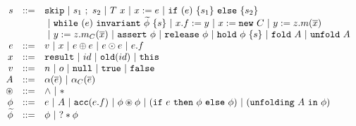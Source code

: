 \begin{spacing}{1.5}
\begin{align*}
\begin{array}{rcl}
s                 &::=& \code{skip}
                       \alt s_1 \ ; \ s_2
                       \alt T\ x \alt x := e
                       \alt \code{if} \ (e) \ \{s_1\} \ \code{else} \ \{s_2\} \\ &&
                       \alt \code{while} \ (e) \ \code{invariant} \ \tphi \ \{ s \}
                       \alt x.f := y
                       \alt x := \code{new} \ C
                       \alt y := z.m(\overline{x}) \\ &&
                       \alt y := z.m_C(\overline{x})
                       \alt \code{assert} \ \phi
                       \alt \code{release} \ \phi
                       \alt \code{hold} \ \phi \ \{ s \}
                       \alt \code{fold} \ A
                       \alt \code{unfold} \ A
                       \\
e                 &::=& v \alt x \alt e \oplus e \alt e \odot e \alt e.f \\
x                 &::=& \code{result} \alt id \alt \code{old}(id) \alt \code{this} \\
v                 &::=& n \alt o \alt \code{null} \alt \code{true} \alt \code{false} \\
A                 &::=& \alpha (\overline{e}) \alt \alpha_C (\overline{e}) \\
\circledast       &::=& \land \alt \ast \\
\phi              &::=& e
                      \alt A
                      \alt \code{acc}(e.f)
                      \alt \phi \circledast \phi
                      \alt (\code{if} \ e \ \code{then} \ \phi \ \code{else} \ \phi)
                      \alt (\code{unfolding} \ A \ \code{in} \ \phi)
                      \\
\tphi             &::=& \phi \alt ? \ast \phi \\
\end{array}
\end{align*}
\end{spacing}
